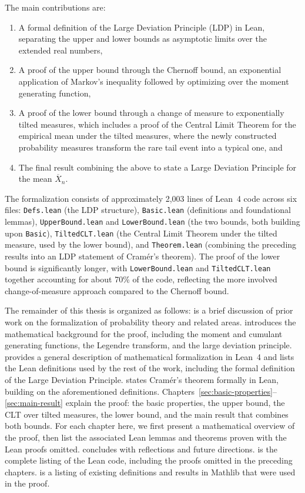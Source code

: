 \documentclass{article}
\begin{document}
The main contributions are:
\begin{enumerate}
  \item A formal definition of the Large Deviation Principle (LDP) in Lean, separating the upper and
    lower bounds as asymptotic limits over the extended real numbers,
  \item A proof of the upper bound through the Chernoff bound, an exponential application of
    Markov's inequality followed by optimizing over the moment generating function,
  \item A proof of the lower bound through a change of measure to exponentially tilted
    measures, which includes a proof of the Central Limit Theorem for the empirical
    mean under the tilted measures, where the newly constructed probability measures transform the
    rare tail event into a typical one, and
  \item The final result combining the above to state a Large Deviation Principle for the mean
    $\overline{X}_n$.
\end{enumerate}
The formalization consists of approximately 2,003 lines of Lean~4 code across six files:
\texttt{Defs.lean} (the LDP structure),
\texttt{Basic.lean} (definitions and foundational lemmas),
\texttt{UpperBound.lean} and \texttt{LowerBound.lean}
(the two bounds, both building upon \texttt{Basic}),
\texttt{TiltedCLT.lean} (the Central Limit Theorem under the tilted measure, used by the
lower bound), and
\texttt{Theorem.lean} (combining the preceding results into an LDP statement of Cram{\'e}r's
theorem).
The proof of the lower bound is significantly longer, with \texttt{LowerBound.lean} and
\texttt{TiltedCLT.lean} together accounting for about 70\% of the code, reflecting the more
involved change-of-measure approach compared to the Chernoff bound.

The remainder of this thesis is organized as follows:  is a brief discussion
of prior work on the formalization of probability theory and related areas.
 introduces the mathematical background for the proof, including
the moment and cumulant generating functions, the Legendre transform, and the large deviation
principle.
 provides a general description of mathematical formalization in Lean~4 and
lists the Lean definitions used by the rest of the work, including the formal definition of the
Large Deviation Principle.
 states Cram{\'e}r's theorem formally in Lean, building on the aforementioned
definitions.
Chapters~\ref{sec:basic-properties}--\ref{sec:main-result} explain the proof: the basic properties,
the upper bound, the CLT over tilted measures, the lower bound, and the main result that
combines both bounds. For each chapter here, we first present a mathematical overview of the
proof, then list the associated Lean lemmas and theorems proven with the Lean proofs omitted.
 concludes with reflections and future directions.
 is the complete listing of the Lean code, including the proofs omitted in the
preceding chapters.  is a listing of existing definitions and results in Mathlib
that were used in the proof.
\end{document}
